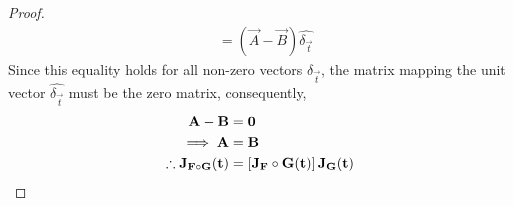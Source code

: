 \begin{lemma}
\begin{proof}
\begin{align*}
            &=\left(\vec{A}-\vec{B}\right)\hat{\delta_\vec{t}}
        \end{align*}
        Since this equality holds for all non-zero vectors $\hat{\delta_\vec{t}}$, the matrix mapping the unit vector $\hat{\delta_\vec{t}}$ must be the zero matrix, consequently,
        \begin{align*}
            \mathbf{A}-\mathbf{B}&=\mathbf{0}\\
            \implies\mathbf{A}&=\mathbf{B}\\
            \therefore\mathbf{J}_{\mathbf{F}\circ\mathbf{G}}(\mathbf{t})&=\left[\mathbf{J}_{\mathbf{F}}\circ\mathbf{G}(\mathbf{t})\right]\mathbf{J}_{\mathbf{G}}(\mathbf{t})
        \end{align*}
    \end{proof}
\end{lemma} 

